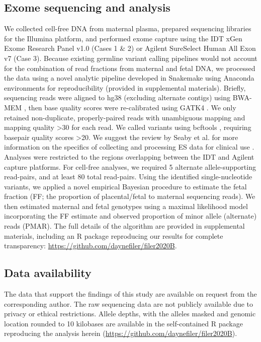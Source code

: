 \documentclass{article}\usepackage[]{graphicx}\usepackage[]{color}
\begin{document}
\subsection{Exome sequencing and analysis}
We collected cell-free DNA from maternal plasma, prepared sequencing libraries for the Illumina platform, and performed exome capture using the IDT xGen Exome Research Panel v1.0 (Cases 1 \& 2) or Agilent SureSelect Human All Exon v7 (Case 3).
Because existing germline variant calling pipelines would not account for the combination of read fractions from maternal and fetal DNA, we processed the data using a novel analytic pipeline developed in Snakemake \cite{koster:2012aa} using Anaconda environments for reproducibility (provided in supplemental materials).
Briefly, sequencing reads were aligned to hg38 (excluding alternate contigs) using BWA-MEM \cite{li:2013ab}, then base quality scores were re-calibrated using GATK4 \cite{mckenna:2010aa,van-der-auwera:2013aa,poplin:2018aa}.
We only retained non-duplicate, properly-paired reads with unambiguous mapping and mapping quality >30 for each read.
We called variants using bcftools \cite{li:2011aa}, requiring basepair quality scores >20.
We suggest the review by Seaby et al. for more information on the specifics of collecting and processing ES data for clinical use \cite{seaby:2016aa}.
Analyses were restricted to the regions overlapping between the IDT and Agilent capture platforms.
For cell-free analyses, we required 5 alternate allele-supporting read-pairs, and at least 80 total read-pairs.
Using the identified single-nucleotide variants, we applied a novel empirical Bayesian procedure to estimate the fetal fraction (FF; the proportion of placental/fetal to maternal sequencing reads).
We then estimated maternal and fetal genotypes using a maximal likelihood model incorporating the FF estimate and observed proportion of minor allele (alternate) reads (PMAR).
The full details of the algorithm are provided in supplemental materials, including an R \cite{r-core-team:2019aa} package reproducing our results for complete transparency: \url{https://github.com/daynefiler/filer2020B}.

\subsection{Data availability}
The data that support the findings of this study are available on request from the corresponding author.
The raw sequencing data are not publicly available due to privacy or ethical restrictions.
Allele depths, with the alleles masked and genomic location rounded to 10 kilobases are available in the self-contained R package reproducing the analysis herein (\url{https://github.com/daynefiler/filer2020B}).
\end{document}
